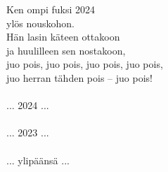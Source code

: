 Ken ompi fuksi 2024 \\ ylös nouskohon. \\ Hän lasin käteen ottakoon \\ ja huulilleen sen nostakoon, \\ juo pois, juo pois, juo pois, juo pois, \\ juo herran tähden pois -- juo pois! \\
\hspace{10mm} \\ ... 2024 ... \\
\hspace{10mm} \\ ... 2023 ... \\
\hspace{10mm} \\ ... ylipäänsä ... 
